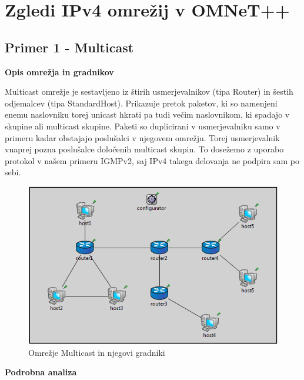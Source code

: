 \documentclass[11pt, a4paper, slovene]{book}
\begin{document}
\section{Zgledi IPv4 omrežij v OMNeT++}
\subsection{Primer 1 - Multicast}

\large \bf Opis omrežja in gradnikov
\normalfont \normalsize 

Multicast omrežje je sestavljeno iz štirih usmerjevalnikov (tipa Router) in šestih odjemalcev (tipa StandardHost). Prikazuje pretok paketov, ki so namenjeni enemu naslovniku torej unicast hkrati pa tudi večim naslovnikom, ki spadajo v skupine ali multicast skupine. Paketi so duplicirani v usmerjevalniku samo v primeru kadar obstajajo poslušalci v njegovem omrežju. Torej usmerjevalnik vnaprej pozna poslušalce določenih multicast skupin. To dosežemo z uporabo protokol v našem primeru IGMPv2, saj IPv4 takega delovanja ne podpira sam po sebi.
\begin{figure}[h]
	\centering
	\includegraphics[width=\textwidth]{Multicast.png}
	\caption{Omrežje Multicast in njegovi gradniki}
	\label{Multicast}	
\end{figure}
\pagebreak

\large\bf Podrobna analiza
\normalfont \normalsize 
\end{document}
